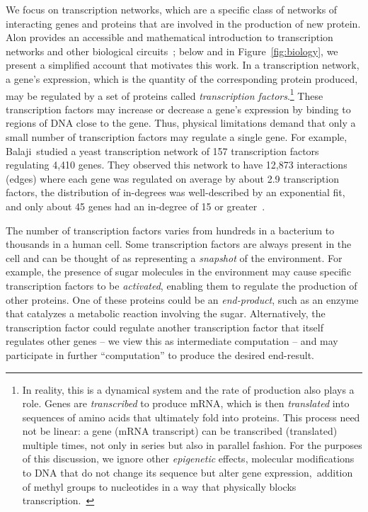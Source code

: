 We focus on transcription networks, which are a specific class of networks of
interacting genes and proteins that are involved in the production of new
protein. Alon provides an accessible and mathematical introduction to
transcription networks and other biological circuits~\cite{Alon:2006}; below and
in Figure~\ref{fig:biology}, we present a simplified account that motivates this
work.  In a transcription network, a gene's expression, which is the quantity of
the corresponding protein produced, may be regulated by a set of proteins called
\emph{transcription factors}.\footnote{In reality, this is a dynamical system
and the rate of production also plays a role.  Genes are \emph{transcribed} to
produce mRNA, which is then \emph{translated} into sequences of amino acids that
ultimately fold into proteins.  This process need not be linear: a gene (mRNA
transcript) can be transcribed (translated) multiple times, not only in series
but also in parallel fashion.  For the purposes of this discussion, we ignore
other \emph{epigenetic} effects, \ie molecular modifications to DNA that do not
change its sequence but alter gene expression,~\eg addition of methyl groups to
nucleotides in a way that physically blocks transcription.~} These transcription factors may increase or decrease
a gene's expression by binding to regions of DNA close to the gene. Thus,
physical limitations demand that only a small number of transcription factors
may regulate a single gene.  For example, Balaji~\etal studied a yeast
transcription network of 157 transcription factors regulating 4,410 genes. They
observed this network to have 12,873 interactions (edges) where each gene was
regulated on average by about 2.9 transcription factors, the distribution of
in-degrees was well-described by an exponential fit, and only about 45 genes had
an in-degree of 15 or greater~\cite{Balaji:2006}.

The number of transcription factors varies from hundreds in a bacterium to
thousands in a human cell. Some transcription factors are always present in the
cell and can be thought of as representing a \emph{snapshot} of the environment.
For example, the presence of sugar molecules in the environment may cause
specific transcription factors to be \emph{activated}, enabling them to regulate
the production of other proteins.  One of these proteins could be an
\emph{end-product}, such as an enzyme that catalyzes a metabolic reaction
involving the sugar. Alternatively, the transcription factor could regulate
another transcription factor that itself
regulates other genes -- we view this as intermediate computation -- and may
participate in further ``computation'' to produce the desired end-result.

